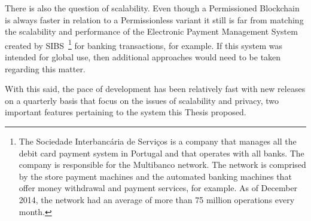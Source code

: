 There is also the question of scalability. Even though a Permissioned
Blockchain is always faster in relation to a Permissionless variant it still is
far from matching the scalability and performance of the Electronic Payment
Management System created by SIBS~\footnote{The Sociedade Interbancária de
Serviços is a company that manages all the debit card payment system in
Portugal and that operates with all banks. The company is responsible for the
Multibanco network.  The network is comprised by the store payment machines and
the automated banking machines that offer money withdrawal and payment
services, for example.  As of December 2014, the network had an average of more
than 75 million operations every month.} for banking transactions, for example.
If this system was intended for global use, then additional approaches would
need to be taken regarding this matter.

With this said, the pace of development has been relatively fast with new
releases on a quarterly basis that focus on the issues of scalability and
privacy, two important features pertaining to the system this Thesis proposed.
